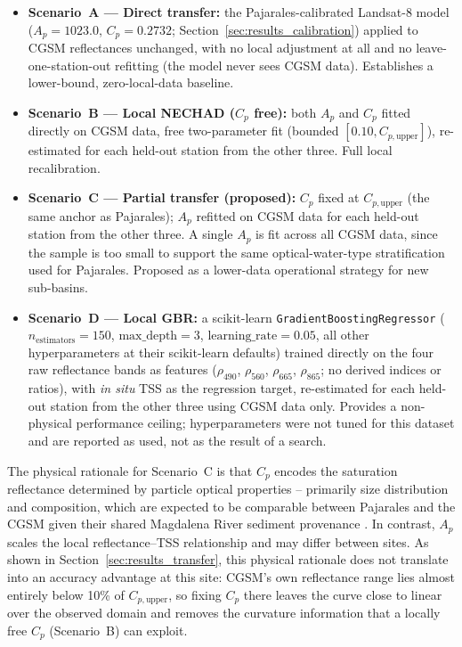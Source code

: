 \documentclass[remotesensing,article,submit,pdftex,moreauthors]{Definitions/mdpi}
\begin{document}
\begin{itemize}
    \item \textbf{Scenario~A — Direct transfer:} the Pajarales-calibrated
          Landsat-8 model ($A_p = 1023.0$, $C_p = 0.2732$;
          Section~\ref{sec:results_calibration}) applied to CGSM
          reflectances unchanged, with no local adjustment at all and no
          leave-one-station-out refitting (the model never sees CGSM
          data). Establishes a lower-bound, zero-local-data baseline.
 
    \item \textbf{Scenario~B — Local NECHAD ($C_p$ free):} both $A_p$
          and $C_p$ fitted directly on CGSM data, free two-parameter fit
          (bounded $[0.10, C_{p,\text{upper}}]$), re-estimated for each
          held-out station from the other three. Full local
          recalibration.
 
    \item \textbf{Scenario~C — Partial transfer (proposed):} $C_p$
          fixed at $C_{p,\text{upper}}$ (the same anchor as Pajarales);
          $A_p$ refitted on CGSM data for each held-out station from the
          other three. A single $A_p$ is fit across all CGSM data, since
          the sample is too small to support the same optical-water-type
          stratification used for Pajarales. Proposed as a lower-data
          operational strategy for new sub-basins.
 
    \item \textbf{Scenario~D — Local GBR:} a scikit-learn
          \texttt{GradientBoostingRegressor} \citep{scikit-learn}
          ($n_{\text{estimators}} = 150$, $\text{max\_depth} = 3$,
          $\text{learning\_rate} = 0.05$, all other hyperparameters at
          their scikit-learn defaults) trained directly on the four raw
          reflectance bands as features
          ($\rho_{490}$, $\rho_{560}$, $\rho_{665}$, $\rho_{865}$; no
          derived indices or ratios), with \textit{in situ} TSS as the
          regression target, re-estimated for each held-out station
          from the other three using CGSM data only. Provides a
          non-physical performance ceiling; hyperparameters were not
          tuned for this dataset and are reported as used, not as the
          result of a search.
\end{itemize}
 
The physical rationale for Scenario~C is that $C_p$ encodes the
saturation reflectance determined by particle optical properties --
primarily size distribution and composition, which are expected to be
comparable between Pajarales and the CGSM given their shared Magdalena
River sediment provenance \citep{NECHAD2010854}. In contrast, $A_p$ scales
the local reflectance--TSS relationship and may differ between sites.
As shown in Section~\ref{sec:results_transfer}, this physical rationale
does not translate into an accuracy advantage at this site: CGSM's own
reflectance range lies almost entirely below 10\% of $C_{p,\text{upper}}$,
so fixing $C_p$ there leaves the curve close to linear over the
observed domain and removes the curvature information that a locally
free $C_p$ (Scenario~B) can exploit.
 
\end{document}
